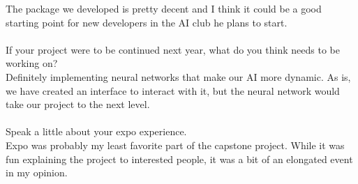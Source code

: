 The package we developed is pretty decent and I think it could be a good starting point for new developers in the AI club he plans to start.\\
\\
If your project were to be continued next year, what do you think needs to be working on?\\
Definitely implementing neural networks that make our AI more dynamic. As is, we have created an interface to interact with it, but the neural network would take our project to the next level.\\
\\
Speak a little about your expo experience.\\
Expo was probably my least favorite part of the capstone project. While it was fun explaining the project to interested people, it was a bit of an elongated event in my opinion.